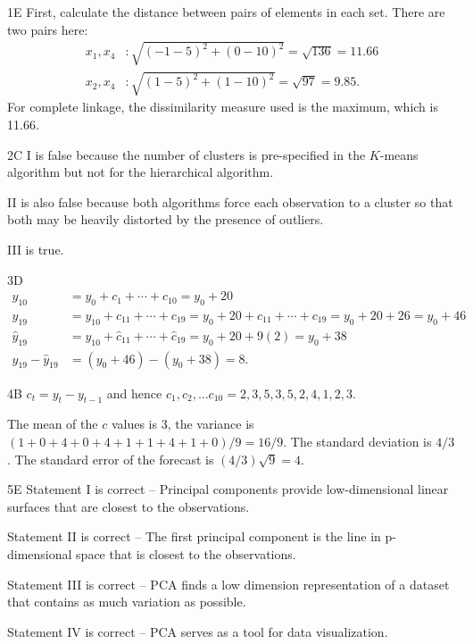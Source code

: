 
\begin{solution}{1}{E}
First, calculate the distance between pairs of elements in each set. There are two pairs here:
\begin{align*}
x_1, x_4 &: \sqrt{(-1-5)^2 + (0-10)^2} = \sqrt{136} = 11.66 \\
x_2, x_4 &: \sqrt{(1-5)^2 + (1-10)^2} = \sqrt{97} = 9.85.
\end{align*}
For complete linkage, the dissimilarity measure used is the maximum, which is 11.66.
\end{solution}

\begin{solution}{2}{C}
I is false because the number of clusters is pre-specified in the $K$-means algorithm but not for the hierarchical algorithm.

II is also false because both algorithms force each observation to a cluster so that both may be heavily distorted by the presence of outliers.

III is true.
\end{solution}

\begin{solution}{3}{D}
\begin{align*}
y_{10} &= y_0 + c_1 + \cdots + c_{10} = y_0 + 20 \\
y_{19} &= y_{10} + c_{11} + \cdots + c_{19} = y_0 + 20 + c_{11} + \cdots + c_{19} = y_0 + 20 + 26 = y_0 + 46 \\
\hat{y}_{19} &= y_{10} + \hat{c}_{11} + \cdots + \hat{c}_{19} = y_0 + 20 + 9(2) = y_0 + 38 \\
y_{19} - \hat{y}_{19} &= (y_0 + 46) - (y_0 + 38) = 8.
\end{align*}
\end{solution}

\begin{solution}{4}{B}
$c_t = y_t - y_{t-1}$ and hence $c_1, c_2, \ldots c_{10} = 2,3,5,3,5,2,4,1,2,3.$

The mean of the $c$ values is 3, the variance is $(1+0+4+0+4+1+1+4+1+0)/9 = 16/9$. The standard deviation is $4/3$. The standard error of the forecast is $(4/3)\sqrt{9} = 4.$
\end{solution}

\begin{solution}{5}{E}
Statement I is correct -- Principal components provide low-dimensional linear surfaces that are closest to the observations.

Statement II is correct -- The first principal component is the line in p-dimensional space that is closest to the observations.

Statement III is correct -- PCA finds a low dimension representation of a dataset that contains as much variation as possible.

Statement IV is correct -- PCA serves as a tool for data visualization.
\end{solution}

